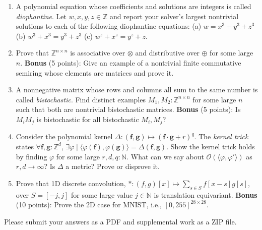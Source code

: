 \documentclass[11pt]{article}
\begin{document}
    \begin{enumerate}
        \item A polynomial equation whose coefficients and solutions are integers is called \textit{diophantine}. Let $w, x, y, z \in \mathbb{Z}$ and report your solver's largest nontrivial solutions to each of the following diophantine equations: (a) $w = x^3+y^3+z^3$ (b) $w^3 + x^3 = y^3+z^3$ (c) $w^z + x^z = y^z + z$.
        \item Prove that $\mathbb{Z}^{n\times n}$ is associative over $\otimes$ and distributive over $\oplus$ for some large $n$. \textbf{Bonus} (5 points): Give an example of a nontrivial finite commutative semiring whose elements are matrices and prove it.
        \item A nonnegative matrix whose rows and columns all sum to the same number is called \textit{bistochastic}. Find distinct examples $M_1, M_2: \mathbb{Z}^{n\times n}$ for some large $n$ such that both are nontrivial bistochastic matrices. \textbf{Bonus} (5 points): Is $M_i M_j$ is bistochastic for all bistochastic $M_i, M_j$?
        \item Consider the polynomial kernel $\Delta: (\mathbf{f}, \mathbf{g})\mapsto (\mathbf{f}\cdot\mathbf{g} + r)^q$. The \textit{kernel trick} states $\forall \mathbf{f}, \mathbf{g}: \mathbb{Z}^d$, $\exists \varphi \mid \langle\varphi(\mathbf{f}), \varphi(\mathbf{g})\rangle = \Delta(\mathbf{f}, \mathbf{g})$. Show the kernel trick holds by finding $\varphi$ for some large $r, d, q: \mathbb{N}$. What can we say about $\mathcal O(\langle\varphi, \varphi'\rangle)$ as $r, d \rightarrow \infty$? Is $\Delta$ a metric? Prove or disprove it.
        \item Prove that 1D discrete convolution, $*: (f, g)[x] \mapsto \sum_{s \in S}f[x-s]g[s]$, over $S=[-j, j]$ for some large value $j \in \mathbb{N}$ is translation equivariant. \textbf{Bonus} (10 points): Prove the 2D case for MNIST, i.e., $[0, 255]^{28\times 28}$.
    \end{enumerate}

    \noindent Please submit your answers as a PDF and supplemental work as a ZIP file.
\end{document}
